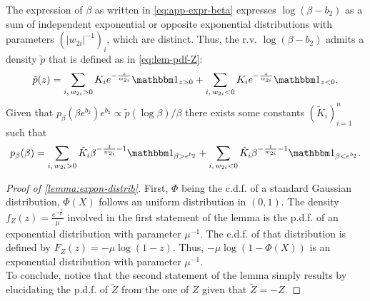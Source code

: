 The expression of $\beta$ as written in \cref{eq:app-expr-beta} expresses $\log(\beta-b_2)$ as a sum of independent exponential or opposite exponential distributions with parameters $(|w_{2i}|^{-1})_{i}$, which are distinct.
Thus, the r.v. $\log(\beta-b_2)$ admits a density $\tilde p$ that is defined as in \cref{eq:lem-pdf-Z}:
\begin{equation}
    \tilde p(z) = \sum_{i,\,w_{2i}>0}K_ie^{-\frac{z}{w_{2i}}}\indic_{z>0} + \sum_{i,\,w_{2i}<0}K_ie^{-\frac{z}{w_{2i}}}\indic_{z<0}.
\end{equation}
Given that $p_\beta(\beta e^{b_2})e^{b_2}\propto\tilde p(\log\beta) / \beta$ there exists some constants $(\tilde K_i)_{i=1}^n$ such that
\begin{equation}
    p_\beta(\beta) = \sum_{i,\,w_{2i}>0}\tilde K_i\beta^{-\frac{1}{w_{2i}}-1}\indic_{\beta>e^{b_2}} + \sum_{i,\,w_{2i}<0}\tilde K_i\beta^{-\frac{1}{w_{2i}}-1}\indic_{\beta<e^{b_2}}.
\end{equation}


\begin{proof}[{Proof of \cref{lemma:expon-distrib}}]
First, $\Phi$ being the c.d.f. of a standard Gaussian distribution, $\Phi(X)$ follows an uniform distribution in $(0,1)$.
The density $f_Z(z)=\frac{e^{-\frac{z}{\mu}}}{\mu}$ involved in the first statement of the lemma is the p.d.f. of an exponential distribution with parameter $\mu^{-1}$. The c.d.f. of that distribution is defined by $F_Z(z) = -\mu\log(1-z)$.
Thus, $-\mu\log(1-\Phi(X))$ is an exponential distribution with parameter $\mu^{-1}$.\\
To conclude, notice that the second statement of the lemma simply results by elucidating the p.d.f. of $\tilde Z$ from the one of $Z$ given that $\tilde Z=-Z$.
\end{proof}



